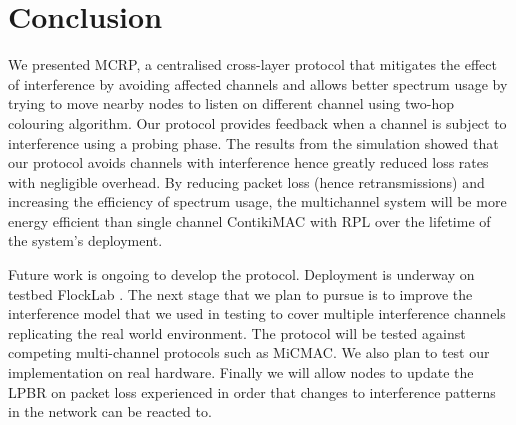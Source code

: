 \section{Conclusion}
\label{sec:conclusion}
We presented MCRP, a centralised cross-layer protocol that mitigates the effect of interference by avoiding affected channels and allows better spectrum usage by trying to move nearby nodes to listen on different channel using two-hop colouring algorithm. Our protocol provides feedback when a channel is subject to interference using a probing phase.
The results from the simulation showed that our protocol avoids channels with interference hence greatly reduced loss rates with negligible overhead. By reducing packet loss (hence retransmissions) and increasing the efficiency of spectrum usage, the multichannel system will be more energy efficient than single channel ContikiMAC with RPL over the lifetime of the system's deployment.

Future work is ongoing to develop the protocol. Deployment is underway on testbed FlockLab \cite{flocklab}. The next stage that we plan to pursue is to improve the interference model that we used in testing to cover multiple interference channels replicating the real world environment. The protocol will be tested against competing multi-channel protocols such as MiCMAC. We also plan to test our implementation on real hardware.  Finally we will allow nodes to update the LPBR on packet loss experienced in order that changes to interference patterns in the network can be reacted to.

